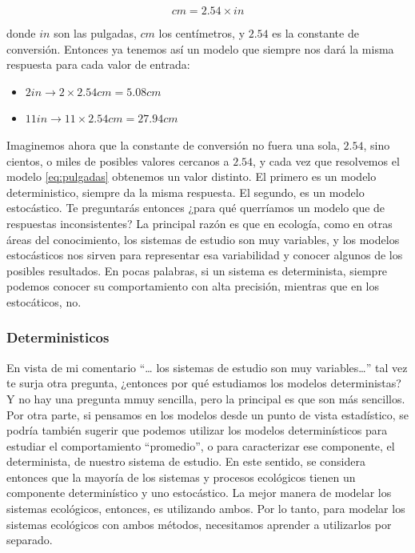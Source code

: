 \documentclass[
]{book}
\providecommand{\tightlist}{%
  \setlength{\itemsep}{0pt}\setlength{\parskip}{0pt}}
\begin{document}
\begin{equation}
    cm = 2.54 \times in  \label{eq:pulgadas}
\end{equation}

donde \(in\) son las pulgadas, \(cm\) los centímetros, y \(2.54\) es la constante de conversión. Entonces ya tenemos así un modelo que siempre nos dará la misma respuesta para cada valor de entrada:

\begin{itemize}
\tightlist
\item
  \(2in \rightarrow 2 \times 2.54cm = 5.08cm\)
\item
  \(11in \rightarrow 11 \times 2.54cm = 27.94cm\)
\end{itemize}

Imaginemos ahora que la constante de conversión no fuera una sola, \(2.54\), sino cientos, o miles de posibles valores cercanos a \(2.54\), y cada vez que resolvemos el modelo \eqref{eq:pulgadas} obtenemos un valor distinto. El primero es un modelo deterministico, siempre da la misma respuesta. El segundo, es un modelo estocástico. Te preguntarás entonces ¿para qué querríamos un modelo que de respuestas inconsistentes? La principal razón es que en ecología, como en otras áreas del conocimiento, los sistemas de estudio son muy variables, y los modelos estocásticos nos sirven para representar esa variabilidad y conocer algunos de los posibles resultados. En pocas palabras, si un sistema es determinista, siempre podemos conocer su comportamiento con alta precisión, mientras que en los estocáticos, no.

\hypertarget{deterministicos}{%
\subsubsection{Deterministicos}\label{deterministicos}}

En vista de mi comentario ``\ldots{} los sistemas de estudio son muy variables\ldots{}'' tal vez te surja otra pregunta, ¿entonces por qué estudiamos los modelos deterministas? Y no hay una pregunta mmuy sencilla, pero la principal es que son más sencillos. Por otra parte, si pensamos en los modelos desde un punto de vista estadístico, se podría también sugerir que podemos utilizar los modelos determinísticos para estudiar el comportamiento ``promedio'', o para caracterizar ese componente, el determinista, de nuestro sistema de estudio. En este sentido, se considera entonces que la mayoría de los sistemas y procesos ecológicos tienen un componente determinístico y uno estocástico. La mejor manera de modelar los sistemas ecológicos, entonces, es utilizando ambos. Por lo tanto, para modelar los sistemas ecológicos con ambos métodos, necesitamos aprender a utilizarlos por separado.
\end{document}
